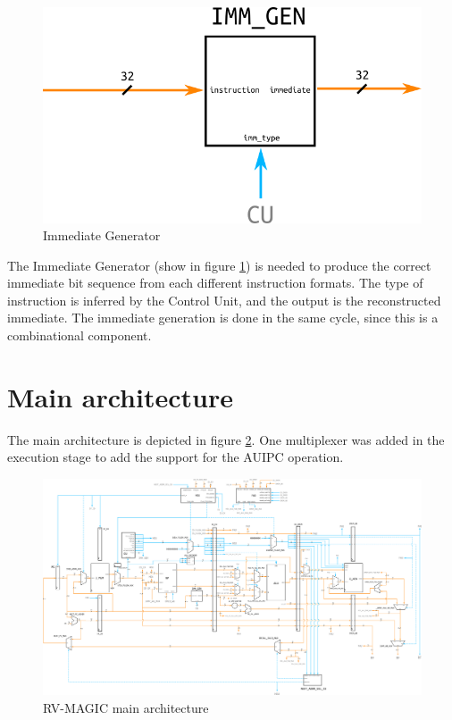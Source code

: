 \documentclass[a4paper]{article}
\begin{document}
\begin{figure}[hbtp]
    \centering
    \includegraphics[]{../immgen/ref/schematic/immgen.png}
    \caption{Immediate Generator}
    \label{fig:immgen}
\end{figure}

The Immediate Generator (show in figure \ref{fig:immgen}) is needed to produce the correct immediate bit sequence from each different instruction formats. The type of instruction is inferred by the Control Unit, and the output is the reconstructed immediate. The immediate generation is done in the same cycle, since this is a combinational component.

\section{Main architecture}
The main architecture is depicted in figure \ref{fig:rv-magic_main}. One multiplexer was added in the execution stage to add the support for the AUIPC operation.

\begin{figure}
	\centering
    \includegraphics[scale=0.4]{../main/ref/schematic/rvMagic.png}
    \caption{RV-MAGIC main architecture}
    \label{fig:rv-magic_main}
\end{figure} 
\end{document}

